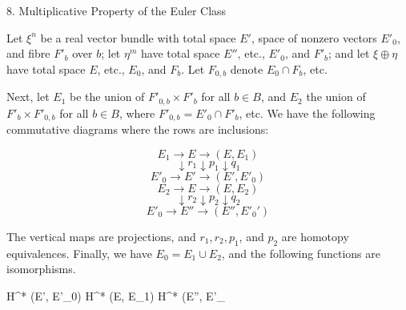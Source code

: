 8. Multiplicative Property of the Euler Class

Let $\xi^n$ be a real vector bundle with total space $E'$, space of nonzero vectors $E'_0$, and fibre $F'_b$ over $b$; let $\eta^m$ have total space $E''$, etc., $E'_0$, and $F'_b$; and let $\xi \oplus \eta$ have total space $E$, etc., $E_0$, and $F_b$. Let $F_{0,b}$ denote $E_0 \cap F_b$, etc.

Next, let $E_1$ be the union of $F'_{0,b} \times F'_b$ for all $b \in B$, and $E_2$ the union of $F'_b \times F'_{0,b}$ for all $b \in B$, where $F'_{0,b} = E'_0 \cap F'_b$, etc. We have the following commutative diagrams where the rows are inclusions:

$$E_1 \rightarrow E \rightarrow (E, E_1)$$
$$\downarrow r_1 \downarrow p_1 \downarrow q_1$$
$$E'_0 \rightarrow E' \rightarrow (E', E'_0)$$
$$E_2 \rightarrow E \rightarrow (E, E_2)$$
$$\downarrow r_2 \downarrow p_2 \downarrow q_2$$
$$E'_0 \rightarrow E'' \rightarrow (E'', E'_0')$$

The vertical maps are projections, and $r_1, r_2, p_1$, and $p_2$ are homotopy equivalences. Finally, we have $E_0 = E_1 \cup E_2$, and the following functions are isomorphisms.

$$H^* (E', E'_0)  H^* (E, E_1) \quad {} \quad H^* (E'', E'_
